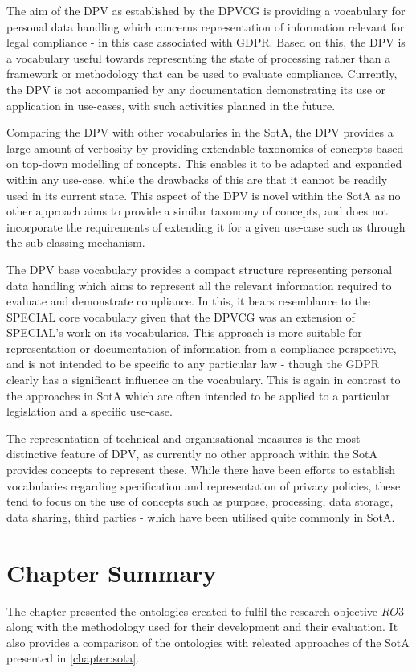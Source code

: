 The aim of the DPV as established by the DPVCG is providing a vocabulary for personal data handling which concerns representation of information relevant for legal compliance - in this case associated with GDPR. Based on this, the DPV is a vocabulary useful towards representing the state of processing rather than a framework or methodology that can be used to evaluate compliance.
Currently, the DPV is not accompanied by any documentation demonstrating its use or application in use-cases, with such activities planned in the future.

Comparing the DPV with other vocabularies in the SotA, the DPV provides a large amount of verbosity by providing extendable taxonomies of concepts based on top-down modelling of concepts. This enables it to be adapted and expanded within any use-case, while the drawbacks of this are that it cannot be readily used in its current state.
This aspect of the DPV is novel within the SotA as no other approach aims to provide a similar taxonomy of concepts, and does not incorporate the requirements of extending it for a given use-case such as through the sub-classing mechanism.

The DPV base vocabulary provides a compact structure representing personal data handling which aims to represent all the relevant information required to evaluate and demonstrate compliance.
In this, it bears resemblance to the SPECIAL core vocabulary \cite{bonatti_special_2018-2} given that the DPVCG was an extension of SPECIAL's work on its vocabularies.
This approach is more suitable for representation or documentation of information from a compliance perspective, and is not intended to be specific to any particular law - though the GDPR clearly has a significant influence on the vocabulary.
This is again in contrast to the approaches in SotA which are often intended to be applied to a particular legislation and a specific use-case.

The representation of technical and organisational measures is the most distinctive feature of DPV, as currently no other approach within the SotA provides concepts to represent these.
While there have been efforts to establish vocabularies regarding specification and representation of privacy policies, these tend to focus on the use of concepts such as purpose, processing, data storage, data sharing, third parties - which have been utilised quite commonly in SotA.

\section*{Chapter Summary}
The chapter presented the ontologies created to fulfil the research objective $RO3$ along with the methodology used for their development and their evaluation. It also provides a comparison of the ontologies with releated approaches of the SotA presented in \autoref{chapter:sota}.

